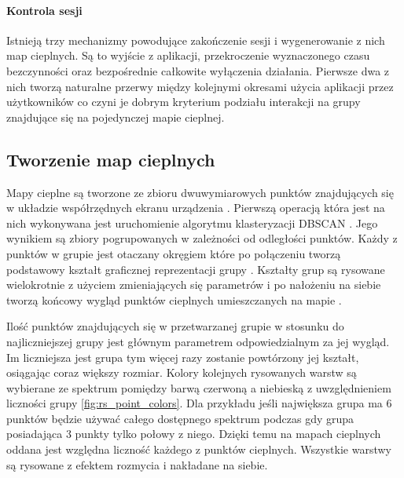 
\paragraph{Kontrola sesji}
Istnieją trzy mechanizmy powodujące zakończenie sesji i wygenerowanie z nich map cieplnych. Są to wyjście z aplikacji, przekroczenie wyznaczonego czasu bezczynności oraz bezpośrednie całkowite wyłączenia działania. Pierwsze dwa z nich tworzą naturalne przerwy między kolejnymi okresami użycia aplikacji przez użytkowników co czyni je dobrym kryterium podziału interakcji na grupy znajdujące się na pojedynczej mapie cieplnej.

\newcommand*\circled[1]{\tikz[baseline=(char.base)]{\node[shape=circle,draw,inner sep=1.2pt] (char) {#1};}}

\subsection{Tworzenie map cieplnych}

Mapy cieplne są tworzone ze zbioru dwuwymiarowych punktów znajdujących się w układzie współrzędnych ekranu urządzenia \circled{1}. Pierwszą operacją która jest na nich wykonywana jest uruchomienie algorytmu klasteryzacji DBSCAN \cite{DBSCAN_Wiki} \circled{2}. Jego wynikiem są zbiory pogrupowanych w zależności od odległości punktów. Każdy z punktów w grupie jest otaczany okręgiem \circled{3} które po połączeniu tworzą podstawowy kształt graficznej reprezentacji grupy \circled{4}. Kształty grup są rysowane wielokrotnie z użyciem zmieniających się parametrów \circled{5} i po nałożeniu na siebie tworzą końcowy wygląd punktów cieplnych umieszczanych na mapie \circled{6}. 

\bigskip
{}

Ilość punktów znajdujących się w przetwarzanej grupie w stosunku do najliczniejszej grupy jest głównym parametrem odpowiedzialnym za jej wygląd. Im liczniejsza jest grupa tym więcej razy zostanie powtórzony jej kształt, osiągając coraz większy rozmiar. Kolory kolejnych rysowanych warstw są wybierane ze spektrum pomiędzy barwą czerwoną a niebieską z uwzględnieniem liczności grupy \ref{fig:rs_point_colors}. Dla przykładu jeśli największa grupa ma $6$ punktów będzie używać całego dostępnego spektrum podczas gdy grupa posiadająca $3$ punkty tylko połowy z niego. Dzięki temu na mapach cieplnych oddana jest względna liczność każdego z punktów cieplnych. Wszystkie warstwy są rysowane z efektem rozmycia i nakładane na siebie. 

